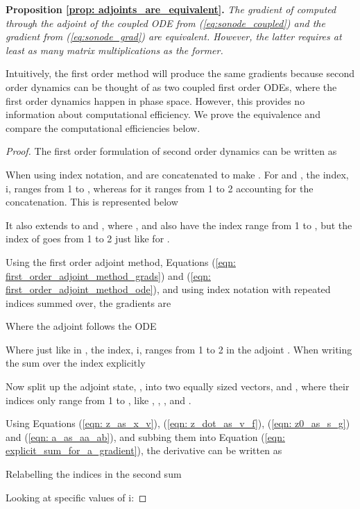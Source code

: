 \documentclass{article}
\theoremstyle{remark}
\theoremstyle{definition}
\begin{document}
\textbf{Proposition \ref{prop: adjoints_are_equivalent}.}\textit{
The gradient of  computed through the adjoint of the coupled ODE from (\ref{eq:sonode_coupled}) and the gradient from (\ref{eq:sonode_grad}) are equivalent. However, the latter requires at least as many matrix multiplications as the former. }

Intuitively, the first order method will produce the same gradients because second order dynamics can be thought of as two coupled first order ODEs, where the first order dynamics happen in phase space. However, this provides no information about computational efficiency. We prove the equivalence and compare the computational efficiencies below.

\begin{proof}
The first order formulation of second order dynamics can be written as


When using index notation,  and  are concatenated to make . For  and , the index, i, ranges from 1 to , whereas for  it ranges from 1 to 2 accounting for the concatenation. This is represented below


It also extends to  and , where ,  and  also have the index range from 1 to , but the index of  goes from 1 to 2 just like for .




Using the first order adjoint method, Equations (\ref{eqn: first_order_adjoint_method_grads}) and (\ref{eqn: first_order_adjoint_method_ode}), and using index notation with repeated indices summed over, the gradients are


Where the adjoint follows the ODE



Where just like in , the index, i, ranges from 1 to 2 in the adjoint . When writing the sum over the index explicitly


Now split up the adjoint state, , into two equally sized vectors,  and , where their indices only range from 1 to , like , , ,  and .


Using Equations (\ref{eqn: z_as_x_v}), (\ref{eqn: z_dot_as_v_f}), (\ref{eqn: z0_as_s_g}) and (\ref{eqn: a_as_aa_ab}), and subbing them into Equation (\ref{eqn: explicit_sum_for_a_gradient}), the derivative can be written as


Relabelling the indices in the second sum 


Looking at specific values of i:








\end{proof}
\end{document}
